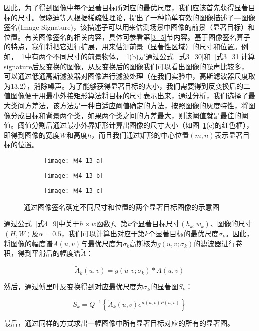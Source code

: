 因此，为了得到图像中每个显著目标所对应的最优尺度，我们应该首先获得显著目标的尺寸。侯晓迪等人根据稀疏性理论，提出了一种简单有效的图像描述子---图像签名(Image Signature)\cite{HouXiaodiTPAMI2012Signature}，该描述子可以用来估测场景中图像的前景（显著目标）和位置。有关图像签名的相关内容，具体可参看第\ref{3_5}节内容。基于图像签名算子的特点，我们将把它进行扩展，用来估测前景（显著性区域）的尺寸和位置。例如，~\ref{图4_13}中有两个不同尺寸的前景物体，~\ref{图4_13}(b)是通过公式~\ref{式3_30}和~\ref{式3_31}计算signature后反变换的图像，从反变换后的图像我们可以看出图像的噪声比较多，可以通过低通高斯滤波器对图像进行滤波处理（在我们实验中，高斯滤波器尺度取为13.2），消除噪声。为了能够获得显著目标的大小，我们需要得到反变换后的二值图像便于用最小外接矩形算法将目标的尺寸表示出来，通过分析，我们选择了最大类间方差法，该方法是一种自适应阈值确定的方法，按照图像的灰度特性，将图像分成目标和背景两个类，如果两个类之间的方差最大，则该阈值就是最佳的阈值。阈值分割后通过最小外界矩形计算出图像的尺寸大小（如图~\ref{图4_13}(c)的红色框），即得到图像的宽度$W$和高度$h$，而且我们通过矩形的中心位置$(m,n)$表示显著目标的位置。
\begin{figure}[h]
  \centering%
  \begin{subfigure}{3cm}
    \texttt{[image: 图4\_13\_a]}
    \caption{}
  \end{subfigure}
  \hspace{4em}%
  \begin{subfigure}{0.2\textwidth}
    \texttt{[image: 图4\_13\_b]}
    \caption{}
  \end{subfigure}
  \hspace{4em}%
  \begin{subfigure}{0.25\textwidth}
    \texttt{[image: 图4\_13\_c]}
    \caption{}
  \end{subfigure}
  \caption{通过图像签名确定不同尺寸和位置的两个显著目标图像的示意图}
  \label{图4_13}
\end{figure}

通过公式~\ref{式4_9}中关于$h×w$函数$f$、第$k$个显著目标尺寸$(h_{k},w_{k})$、图像的尺寸$(H,W)$及$\alpha=0.5$，我们可以计算出对应于第$k$个显著目标的最优尺度$\sigma_{k}$。因此，将图像的幅度谱$A(u,v)$与最优尺度为$\sigma_{k}$高斯核为$g(u,v;\sigma_{k})$的滤波器进行卷积，得到平滑后的幅度谱$\tilde{A}$： 
\begin{linenomath}
\begin{equation}
\tilde{A}_k(u,v)=g(u,v;\sigma_k)\ast A(u,v)
\label{式4_25}
\end{equation}
\end{linenomath}
然后，通过傅里叶反变换得到对应最优尺度为$\sigma_{k}$的显著图$S_{k}$：
\begin{linenomath}
\begin{equation}
S_k=Q^{-1}\left\{\tilde{A}_k(u,v)e^{\mu(u,v)P(u,v)}\right\}
\label{式4_26}
\end{equation}
\end{linenomath}
最后，通过同样的方式求出一幅图像中所有显著目标对应的所有的显著图。

